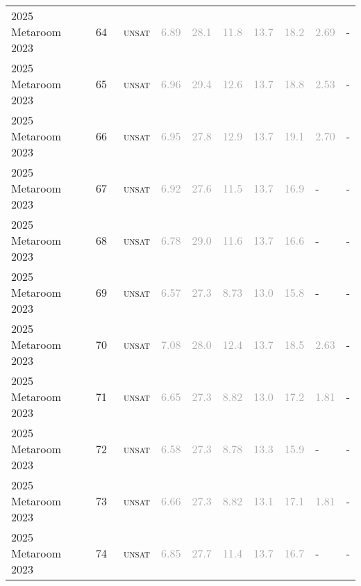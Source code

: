 \begin{center}
{\begin{longtable}{@{}llllllllll@{}}
2025 Metaroom 2023 & 64 & ~\textsc{unsat} & \textcolor{darkgray}{6.89} & \textcolor{darkgray}{28.1} & \textcolor{darkgray}{11.8} & \textcolor{darkgray}{13.7} & \textcolor{darkgray}{18.2} & \textcolor{darkgray}{2.69} & - \\
2025 Metaroom 2023 & 65 & ~\textsc{unsat} & \textcolor{darkgray}{6.96} & \textcolor{darkgray}{29.4} & \textcolor{darkgray}{12.6} & \textcolor{darkgray}{13.7} & \textcolor{darkgray}{18.8} & \textcolor{darkgray}{2.53} & - \\
2025 Metaroom 2023 & 66 & ~\textsc{unsat} & \textcolor{darkgray}{6.95} & \textcolor{darkgray}{27.8} & \textcolor{darkgray}{12.9} & \textcolor{darkgray}{13.7} & \textcolor{darkgray}{19.1} & \textcolor{darkgray}{2.70} & - \\
2025 Metaroom 2023 & 67 & ~\textsc{unsat} & \textcolor{darkgray}{6.92} & \textcolor{darkgray}{27.6} & \textcolor{darkgray}{11.5} & \textcolor{darkgray}{13.7} & \textcolor{darkgray}{16.9} & - & - \\
2025 Metaroom 2023 & 68 & ~\textsc{unsat} & \textcolor{darkgray}{6.78} & \textcolor{darkgray}{29.0} & \textcolor{darkgray}{11.6} & \textcolor{darkgray}{13.7} & \textcolor{darkgray}{16.6} & - & - \\
2025 Metaroom 2023 & 69 & ~\textsc{unsat} & \textcolor{darkgray}{6.57} & \textcolor{darkgray}{27.3} & \textcolor{darkgray}{8.73} & \textcolor{darkgray}{13.0} & \textcolor{darkgray}{15.8} & - & - \\
2025 Metaroom 2023 & 70 & ~\textsc{unsat} & \textcolor{darkgray}{7.08} & \textcolor{darkgray}{28.0} & \textcolor{darkgray}{12.4} & \textcolor{darkgray}{13.7} & \textcolor{darkgray}{18.5} & \textcolor{darkgray}{2.63} & - \\
2025 Metaroom 2023 & 71 & ~\textsc{unsat} & \textcolor{darkgray}{6.65} & \textcolor{darkgray}{27.3} & \textcolor{darkgray}{8.82} & \textcolor{darkgray}{13.0} & \textcolor{darkgray}{17.2} & \textcolor{darkgray}{1.81} & - \\
2025 Metaroom 2023 & 72 & ~\textsc{unsat} & \textcolor{darkgray}{6.58} & \textcolor{darkgray}{27.3} & \textcolor{darkgray}{8.78} & \textcolor{darkgray}{13.3} & \textcolor{darkgray}{15.9} & - & - \\
2025 Metaroom 2023 & 73 & ~\textsc{unsat} & \textcolor{darkgray}{6.66} & \textcolor{darkgray}{27.3} & \textcolor{darkgray}{8.82} & \textcolor{darkgray}{13.1} & \textcolor{darkgray}{17.1} & \textcolor{darkgray}{1.81} & - \\
2025 Metaroom 2023 & 74 & ~\textsc{unsat} & \textcolor{darkgray}{6.85} & \textcolor{darkgray}{27.7} & \textcolor{darkgray}{11.4} & \textcolor{darkgray}{13.7} & \textcolor{darkgray}{16.7} & - & - \\

\end{longtable}}
\end{center}
